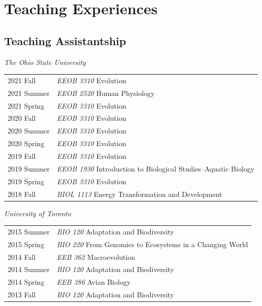 \documentclass[11pt]{article}
\begin{document}
\hspace{0pt}



\section*{Teaching Experiences}

\subsection*{Teaching Assistantship}

\textit{The Ohio State University}\\
\begin{longtable}{p{}  p{}}

2021 Fall & \textit{EEOB 3310} Evolution\\
2021 Summer & \textit{EEOB 2520} Human Physiology\\
2021 Spring & \textit{EEOB 3310} Evolution\\
2020 Fall & \textit{EEOB 3310} Evolution\\
2020 Summer & \textit{EEOB 3310} Evolution\\
2020 Spring & \textit{EEOB 3310} Evolution\\
2019 Fall & \textit{EEOB 3310} Evolution\\
2019 Summer & \textit{EEOB 1930} Introduction to Biological Studies--Aquatic Biology\\
2019 Spring & \textit{EEOB 3310} Evolution\\
2018 Fall & \textit{BIOL 1113} Energy Transformation and Development\\
\end{longtable}


\textit{University of Toronto}\\
\begin{longtable}{p{}  p{}}

2015 Summer  & \textit{BIO 120} Adaptation and Biodiversity\\
2015 Spring & \textit{BIO 220} From Genomics to Ecosystems in a Changing World\\
2014 Fall & \textit{EEB 362} Macroevolution\\
2014 Summer & \textit{BIO 120} Adaptation and Biodiversity\\
2014 Spring & \textit{EEB 386} Avian Biology\\
2013 Fall & \textit{BIO 120} Adaptation and Biodiversity\\

\end{longtable}
\end{document}
